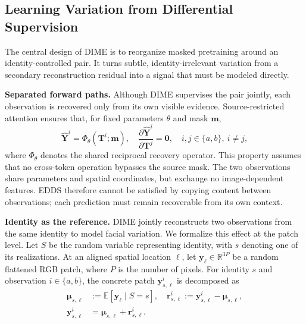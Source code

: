 \documentclass[10pt,journal,compsoc]{IEEEtran}
\begin{document}
\subsection{Learning Variation from Differential Supervision}
\label{sec:dime_formal}

The central design of DIME is to reorganize masked pretraining around an identity-controlled pair. It turns subtle, identity-irrelevant variation from a secondary reconstruction residual into a signal that must be modeled directly.

\noindent\textbf{Separated forward paths.}
Although DIME supervises the pair jointly, each observation is recovered only from its own visible evidence. Source-restricted attention ensures that, for fixed parameters $\theta$ and mask $\mathbf{m}$,
\begin{equation}
\hat{\mathbf{Y}}^{i}
=
\Phi_{\theta}(\mathbf{T}^{i};\mathbf{m}),
\quad
\frac{\partial\hat{\mathbf{Y}}^{i}}
{\partial\mathbf{T}^{j}}
=
\mathbf{0},
\quad
i,j\in\{a,b\},\ i\neq j,
\label{eq:dime_source_isolation}
\end{equation}
where $\Phi_{\theta}$ denotes the shared reciprocal recovery operator. This property assumes that no cross-token operation bypasses the source mask. The two observations share parameters and spatial coordinates, but exchange no image-dependent features. EDDS therefore cannot be satisfied by copying content between observations; each prediction must remain recoverable from its own context.

\noindent\textbf{Identity as the reference.}
DIME jointly reconstructs two observations from the same identity to model facial variation. We formalize this effect at the patch level. Let $S$ be the random variable representing identity, with $s$ denoting one of its realizations. At an aligned spatial location $\ell$, let $\mathbf{y}_{\ell}\in\mathbb{R}^{3P}$ be a random flattened RGB patch, where $P$ is the number of pixels. For identity $s$ and observation $i\in\{a,b\}$, the concrete patch $\mathbf{y}^{i}_{s,\ell}$ is decomposed as
\begin{equation}
\begin{aligned}
\boldsymbol{\mu}_{s,\ell}
&:=\mathbb{E}\!\left[\mathbf{y}_{\ell}\mid S=s\right],\quad
\mathbf{r}^{i}_{s,\ell}
:=\mathbf{y}^{i}_{s,\ell}-\boldsymbol{\mu}_{s,\ell},\\
\mathbf{y}^{i}_{s,\ell}
&=\boldsymbol{\mu}_{s,\ell}+\mathbf{r}^{i}_{s,\ell}.
\end{aligned}
\label{eq:dime_identity_reference}
\end{equation}
\end{document}
